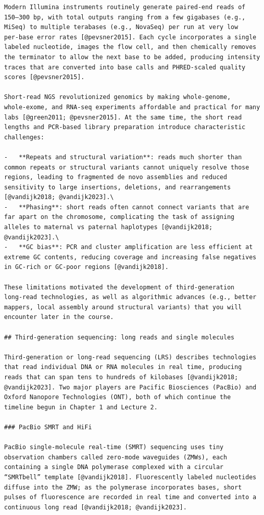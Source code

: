 \documentclass[
  letterpaper,
  DIV=11,
  numbers=noendperiod]{scrreprt}
\begin{document}
\begin{verbatim}
Modern Illumina instruments routinely generate paired‑end reads of 150–300 bp, with total outputs ranging from a few gigabases (e.g., MiSeq) to multiple terabases (e.g., NovaSeq) per run at very low per‑base error rates [@pevsner2015]. Each cycle incorporates a single labeled nucleotide, images the flow cell, and then chemically removes the terminator to allow the next base to be added, producing intensity traces that are converted into base calls and PHRED‑scaled quality scores [@pevsner2015].

Short‑read NGS revolutionized genomics by making whole‑genome, whole‑exome, and RNA‑seq experiments affordable and practical for many labs [@green2011; @pevsner2015]. At the same time, the short read lengths and PCR‑based library preparation introduce characteristic challenges:

-   **Repeats and structural variation**: reads much shorter than common repeats or structural variants cannot uniquely resolve those regions, leading to fragmented de novo assemblies and reduced sensitivity to large insertions, deletions, and rearrangements [@vandijk2018; @vandijk2023].\
-   **Phasing**: short reads often cannot connect variants that are far apart on the chromosome, complicating the task of assigning alleles to maternal vs paternal haplotypes [@vandijk2018; @vandijk2023].\
-   **GC bias**: PCR and cluster amplification are less efficient at extreme GC contents, reducing coverage and increasing false negatives in GC‑rich or GC‑poor regions [@vandijk2018].

These limitations motivated the development of third‑generation long‑read technologies, as well as algorithmic advances (e.g., better mappers, local assembly around structural variants) that you will encounter later in the course.

## Third‑generation sequencing: long reads and single molecules

Third‑generation or long‑read sequencing (LRS) describes technologies that read individual DNA or RNA molecules in real time, producing reads that can span tens to hundreds of kilobases [@vandijk2018; @vandijk2023]. Two major players are Pacific Biosciences (PacBio) and Oxford Nanopore Technologies (ONT), both of which continue the timeline begun in Chapter 1 and Lecture 2.

### PacBio SMRT and HiFi

PacBio single‑molecule real‑time (SMRT) sequencing uses tiny observation chambers called zero‑mode waveguides (ZMWs), each containing a single DNA polymerase complexed with a circular “SMRTbell” template [@vandijk2018]. Fluorescently labeled nucleotides diffuse into the ZMW; as the polymerase incorporates bases, short pulses of fluorescence are recorded in real time and converted into a continuous long read [@vandijk2018; @vandijk2023].


\end{verbatim}
\end{document}
